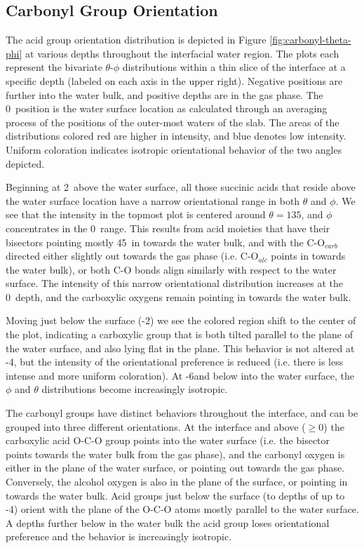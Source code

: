 \subsection*{Carbonyl Group Orientation}

The acid group orientation distribution is depicted in Figure \ref{fig:carbonyl-theta-phi} at various depths throughout the interfacial water region. The plots each represent the bivariate $\theta$-$\phi$ distributions within a thin slice of the interface at a specific depth (labeled on each axis in the upper right). Negative positions are further into the water bulk, and positive depths are in the gas phase. The 0\angs~position is the water surface location as calculated through an averaging process of the positions of the outer-most waters of the slab. The areas of the distributions colored red are higher in intensity, and blue denotes low intensity. Uniform coloration indicates isotropic orientational behavior of the two angles depicted.

Beginning at 2\angs~above the water surface, all those succinic acids that reside above the water surface location have a narrow orientational range in both $\theta$ and $\phi$. We see that the intensity in the topmost plot is centered around $\theta=135$\textdegree, and $\phi$ concentrates in the 0\textdegree~range. This results from acid moieties that have their bisectors pointing mostly 45\textdegree~in towards the water bulk, and with the C-O$_{carb}$ directed either slightly out towards the gas phase (i.e. C-O$_{alc}$ points in towards the water bulk), or both C-O bonds align similarly with respect to the water surface. The intensity of this narrow orientational distribution increases at the 0\angs~depth, and the carboxylic oxygens remain pointing in towards the water bulk.

Moving just below the surface (-2\angs) we see the colored region shift to the center of the plot, indicating a carboxylic group that is both tilted parallel to the plane of the water surface, and also lying flat in the plane. This behavior is not altered at -4\angs, but the intensity of the orientational preference is reduced (i.e. there is less intense and more uniform coloration). At -6\angs and below into the water surface, the $\phi$ and $\theta$ distributions become increasingly isotropic.

The carbonyl groups have distinct behaviors throughout the interface, and can be grouped into three different orientations. At the interface and above ($\geq 0$\angs) the carboxylic acid O-C-O group points into the water surface (i.e. the bisector points towards the water bulk from the gas phase), and the carbonyl oxygen is either in the plane of the water surface, or pointing out towards the gas phase. Conversely, the alcohol oxygen is also in the plane of the surface, or pointing in towards the water bulk. Acid groups just below the surface (to depths of up to -4\angs) orient with the plane of the O-C-O atoms mostly parallel to the water surface. A depths further below in the water bulk the acid group loses orientational preference and the behavior is increasingly isotropic.

